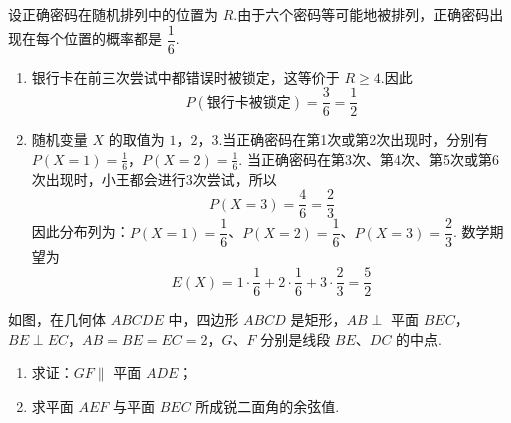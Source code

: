 \begin{solution}
设正确密码在随机排列中的位置为 \(R\).由于六个密码等可能地被排列，正确密码出现在每个位置的概率都是 \(\dfrac16\).

\begin{enumerate}
\item 银行卡在前三次尝试中都错误时被锁定，这等价于 \(R\geqslant4\).因此
\[
P(\text{银行卡被锁定})=\frac{3}{6}=\frac12
\]

\item 随机变量 \(X\) 的取值为 \(1\)，\(2\)，\(3\).当正确密码在第1次或第2次出现时，分别有
\(P(X=1)=\frac16\)，\(P(X=2)=\frac16\).
当正确密码在第3次、第4次、第5次或第6次出现时，小王都会进行3次尝试，所以
\[
P(X=3)=\frac46=\frac23
\]
因此分布列为：\(P(X=1)=\dfrac16\)、\(P(X=2)=\dfrac16\)、\(P(X=3)=\dfrac23\).
数学期望为
\[
E(X)=1\cdot\frac16+2\cdot\frac16+3\cdot\frac23=\frac52
\]
\end{enumerate}
\end{solution}

\begin{problem}
如图，在几何体 \(ABCDE\) 中，四边形 \(ABCD\) 是矩形，\(AB \perp\) 平面 \(BEC\)，\(BE \perp EC\)，\(AB = BE = EC = 2\)，\(G\)、\(F\) 分别是线段 \(BE\)、\(DC\) 的中点.
\begin{enumerate}
\item 求证：\(GF \parallel\) 平面 \(ADE\)；
\item 求平面 \(AEF\) 与平面 \(BEC\) 所成锐二面角的余弦值.
\end{enumerate}
\end{problem}

